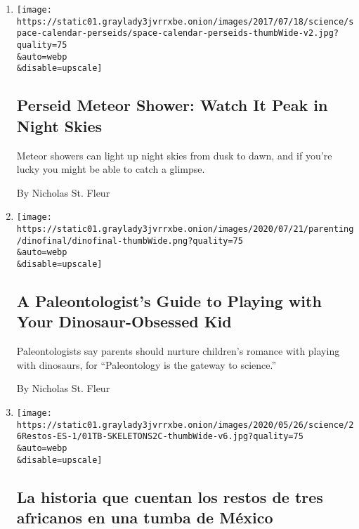 \begin{enumerate}
\def\labelenumi{\arabic{enumi}.}
\item
  \href{/2020/08/11/science/perseid-meteor-shower.html}{}

  \texttt{[image: https://static01.graylady3jvrrxbe.onion/images/2017/07/18/science/space-calendar-perseids/space-calendar-perseids-thumbWide-v2.jpg?quality=75\\\&auto=webp\\\&disable=upscale]}

  \hypertarget{perseid-meteor-shower-watch-it-peak-in-night-skies}{%
  \subsection{Perseid Meteor Shower: Watch It Peak in Night
  Skies}\label{perseid-meteor-shower-watch-it-peak-in-night-skies}}

  Meteor showers can light up night skies from dusk to dawn, and if
  you're lucky you might be able to catch a glimpse.

  By Nicholas St. Fleur
\item
  \href{/2020/07/21/parenting/dinosaur-kids.html}{}

  \texttt{[image: https://static01.graylady3jvrrxbe.onion/images/2020/07/21/parenting/dinofinal/dinofinal-thumbWide.png?quality=75\\\&auto=webp\\\&disable=upscale]}

  \hypertarget{a-paleontologists-guide-to-playing-with-your-dinosaur-obsessed-kid}{%
  \subsection{A Paleontologist's Guide to Playing with Your
  Dinosaur-Obsessed
  Kid}\label{a-paleontologists-guide-to-playing-with-your-dinosaur-obsessed-kid}}

  Paleontologists say parents should nurture children's romance with
  playing with dinosaurs, for ``Paleontology is the gateway to
  science.''

  By Nicholas St. Fleur
\item
  \href{/es/2020/05/26/espanol/ciencia-y-tecnologia/esclavitud-africa-mexico.html}{}

  \texttt{[image: https://static01.graylady3jvrrxbe.onion/images/2020/05/26/science/26Restos-ES-1/01TB-SKELETONS2C-thumbWide-v6.jpg?quality=75\\\&auto=webp\\\&disable=upscale]}

  \hypertarget{la-historia-que-cuentan-los-restos-de-tres-africanos-en-una-tumba-de-muxe9xico}{%
  \subsection{La historia que cuentan los restos de tres africanos en
  una tumba de
  México}\label{la-historia-que-cuentan-los-restos-de-tres-africanos-en-una-tumba-de-muxe9xico}}


\end{enumerate}
